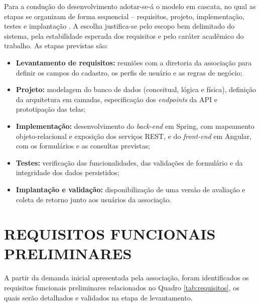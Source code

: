 \documentclass[
        oneside,      %
        english,			
        brazil			 
        ]{abntspiifac}
\begin{document}
Para a condução do desenvolvimento adotar-se-á o modelo em cascata, no qual as etapas se organizam de forma sequencial -- requisitos, projeto, implementação, testes e implantação \citep{sommerville2019engenharia}. A escolha justifica-se pelo escopo bem delimitado do sistema, pela estabilidade esperada dos requisitos e pelo caráter acadêmico do trabalho. As etapas previstas são:

\begin{itemize}
    \item \textbf{Levantamento de requisitos:} reuniões com a diretoria da associação para definir os campos do cadastro, os perfis de usuário e as regras de negócio;
    \item \textbf{Projeto:} modelagem do banco de dados (conceitual, lógica e física), definição da arquitetura em camadas, especificação dos \textit{endpoints} da API e prototipação das telas;
    \item \textbf{Implementação:} desenvolvimento do \textit{back-end} em Spring, com mapeamento objeto-relacional e exposição dos serviços REST, e do \textit{front-end} em Angular, com os formulários e as consultas previstas;
    \item \textbf{Testes:} verificação das funcionalidades, das validações de formulário e da integridade dos dados persistidos;
    \item \textbf{Implantação e validação:} disponibilização de uma versão de avaliação e coleta de retorno junto aos usuários da associação.
\end{itemize}

\section{REQUISITOS FUNCIONAIS PRELIMINARES}

A partir da demanda inicial apresentada pela associação, foram identificados os requisitos funcionais preliminares relacionados no Quadro \ref{tab:requisitos}, os quais serão detalhados e validados na etapa de levantamento.
\end{document}
